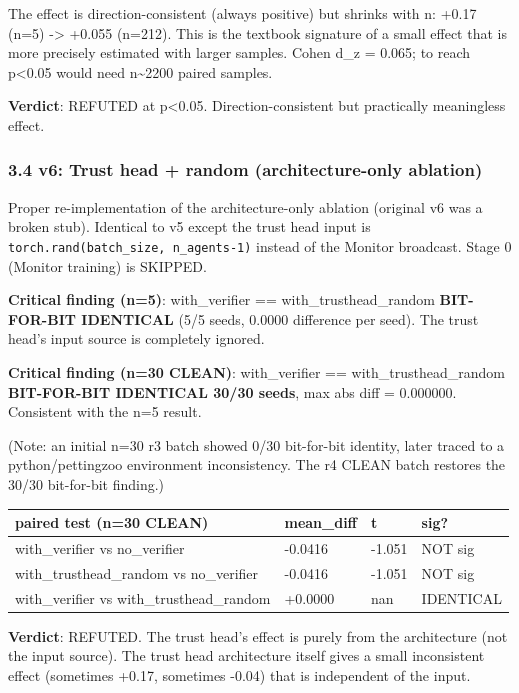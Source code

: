 \documentclass[
]{article}
\newcounter{none} %
\begin{document}
The effect is direction-consistent (always positive) but shrinks with n:
+0.17 (n=5) -\textgreater{} +0.055 (n=212). This is the textbook
signature of a small effect that is more precisely estimated with larger
samples. Cohen d\_z = 0.065; to reach p\textless0.05 would need
n\textasciitilde2200 paired samples.

\textbf{Verdict}: REFUTED at p\textless0.05. Direction-consistent but
practically meaningless effect.

\subsubsection{3.4 v6: Trust head + random (architecture-only
ablation)}\label{v6-trust-head-random-architecture-only-ablation}

Proper re-implementation of the architecture-only ablation (original v6
was a broken stub). Identical to v5 except the trust head input is
\texttt{torch.rand(batch\_size,\ n\_agents-1)} instead of the Monitor
broadcast. Stage 0 (Monitor training) is SKIPPED.

\textbf{Critical finding (n=5)}: with\_verifier ==
with\_trusthead\_random \textbf{BIT-FOR-BIT IDENTICAL} (5/5 seeds,
0.0000 difference per seed). The trust head's input source is completely
ignored.

\textbf{Critical finding (n=30 CLEAN)}: with\_verifier ==
with\_trusthead\_random \textbf{BIT-FOR-BIT IDENTICAL 30/30 seeds}, max
abs diff = 0.000000. Consistent with the n=5 result.

(Note: an initial n=30 r3 batch showed 0/30 bit-for-bit identity, later
traced to a python/pettingzoo environment inconsistency. The r4 CLEAN
batch restores the 30/30 bit-for-bit finding.)

{\def\LTcaptype{none} %
\begin{longtable}[]{@{}llll@{}}
\toprule\noalign{}
paired test (n=30 CLEAN) & mean\_diff & t & sig? \\
\midrule\noalign{}
\endhead
\bottomrule\noalign{}
\endlastfoot
with\_verifier vs no\_verifier & -0.0416 & -1.051 & NOT sig \\
with\_trusthead\_random vs no\_verifier & -0.0416 & -1.051 & NOT sig \\
with\_verifier vs with\_trusthead\_random & +0.0000 & nan & IDENTICAL \\
\end{longtable}
}

\textbf{Verdict}: REFUTED. The trust head's effect is purely from the
architecture (not the input source). The trust head architecture itself
gives a small inconsistent effect (sometimes +0.17, sometimes -0.04)
that is independent of the input.
\end{document}
